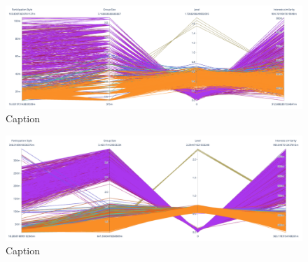 \begin{figure}
    \centering
    \includegraphics[width=\textwidth]{images/para_smp_20.png}
    \caption{Caption}
    \label{fig:my_label}
\end{figure}

\begin{figure}
    \centering
    \includegraphics[width=\textwidth]{images/para_smp_200.png}
    \caption{Caption}
    \label{fig:my_label}
\end{figure}


